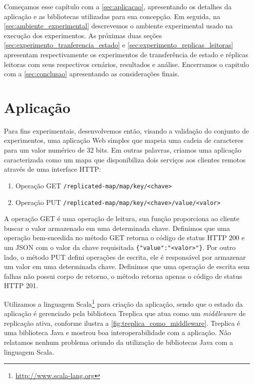 Começamos esse capítulo com a \autoref{sec:aplicacao}, apresentando os detalhes da
aplicação e as bibliotecas utilizadas para sua concepção. Em seguida, na
\autoref{sec:ambiente_experimental} descrevemos o ambiente experimental usado na execução
dos experimentos. As próximas duas seções \autoref{sec:experimento_tranferencia_estado} e
\autoref{sec:experimento_replicas_leitoras} apresentam respectivamente os experimentos de
transferência de estado e réplicas leitoras com seus respectivos cenários, resultados e
análise. Encerramos o capitulo com a \autoref{sec:conclusao} apresentando as considerações
finais.


\section{Aplicação}\label{sec:aplicacao}

Para fins experimentais, desenvolvemos então, visando a validação do conjunto de
experimentos, uma aplicação Web simples que mapeia uma cadeia de caracteres para um valor
numérico de 32 bits. Em outras palavras, criamos uma aplicação caracterizada como um mapa
que disponibiliza dois serviços aos clientes remotos através de uma interface HTTP:

\begin{enumerate}
  \item Operação GET \verb|/replicated-map/map/key/<chave>|
  \item Operação PUT \verb|/replicated-map/map/key/<chave>/value/<valor>|
\end{enumerate}

A operação GET é uma operação de leitura, sua função proporciona ao cliente buscar o valor
armazenado em uma determinada chave. Definimos que uma operação bem-sucedida no método GET
retorna o código de status HTTP 200 e um JSON com o valor da chave requisitada
\verb|{"value":"<valor>"}|. Por outro lado, o método PUT defini operações de escrita, ele
é responsável por armazenar um valor em uma determinada chave. Definimos que uma operação
de escrita sem falhas não possui corpo de retorno, o método retorna apenas o código de
status HTTP 201.

Utilizamos a linguagem Scala\footnote{\url{http://www.scala-lang.org}} para criação da
aplicação, sendo que o estado da aplicação é gerenciado pela biblioteca Treplica que atua
como um \emph{middleware} de replicação ativa, conforme ilustra a
\autoref{fig:treplica_como_middleware}. Treplica é uma biblioteca Java e mostrou boa
interoperabilidade com a aplicação. Não relatamos nenhum problema oriundo da utilização de
bibliotecas Java com a linguagem Scala.

